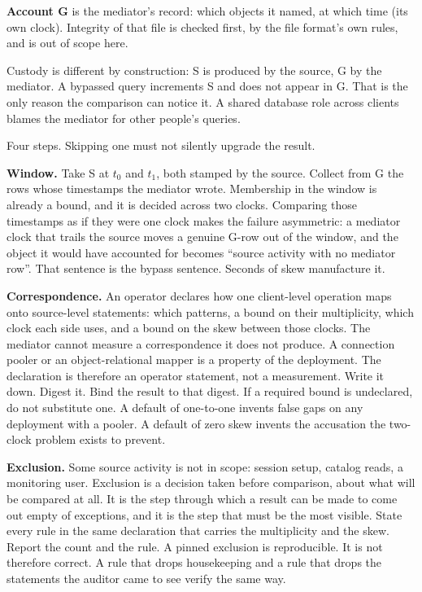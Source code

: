\documentclass[11pt]{article}
\begin{document}
\textbf{Account G} is the mediator's record: which objects it named, at which time (its own clock). Integrity of that file is checked first, by the file format's own rules, and is out of scope here.

Custody is different by construction: S is produced by the source, G by the mediator. A bypassed query increments S and does not appear in G. That is the only reason the comparison can notice it. A shared database role across clients blames the mediator for other people's queries.

Four steps. Skipping one must not silently upgrade the result.

\textbf{Window.} Take S at $t_0$ and $t_1$, both stamped by the source. Collect from G the rows whose timestamps the mediator wrote. Membership in the window is already a bound, and it is decided across two clocks. Comparing those timestamps as if they were one clock makes the failure asymmetric: a mediator clock that trails the source moves a genuine G-row out of the window, and the object it would have accounted for becomes ``source activity with no mediator row''. That sentence is the bypass sentence. Seconds of skew manufacture it.

\textbf{Correspondence.} An operator declares how one client-level operation maps onto source-level statements: which patterns, a bound on their multiplicity, which clock each side uses, and a bound on the skew between those clocks. The mediator cannot measure a correspondence it does not produce. A connection pooler or an object-relational mapper is a property of the deployment. The declaration is therefore an operator statement, not a measurement. Write it down. Digest it. Bind the result to that digest. If a required bound is undeclared, do not substitute one. A default of one-to-one invents false gaps on any deployment with a pooler. A default of zero skew invents the accusation the two-clock problem exists to prevent.

\textbf{Exclusion.} Some source activity is not in scope: session setup, catalog reads, a monitoring user. Exclusion is a decision taken before comparison, about what will be compared at all. It is the step through which a result can be made to come out empty of exceptions, and it is the step that must be the most visible. State every rule in the same declaration that carries the multiplicity and the skew. Report the count and the rule. A pinned exclusion is reproducible. It is not therefore correct. A rule that drops housekeeping and a rule that drops the statements the auditor came to see verify the same way.
\end{document}
